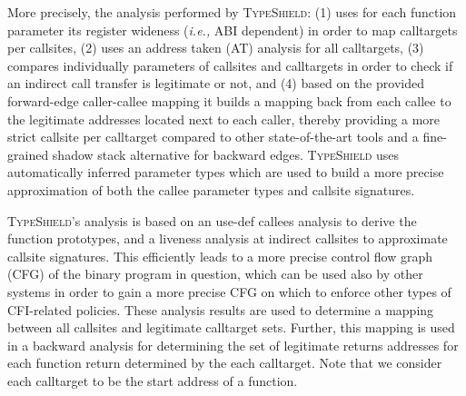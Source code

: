 More precisely, the analysis performed by \textsc{TypeShield}:
(1) uses for each function parameter its register wideness (\textit{i.e.,} ABI dependent) in order to map calltargets per callsites,  
(2) uses an address taken (AT) analysis for all calltargets, 
(3) compares individually parameters of callsites and calltargets in order to check if an indirect call transfer is legitimate or not, and
(4) based on the provided forward-edge caller-callee mapping it builds a mapping back from each callee to the legitimate addresses located next to each caller,
thereby providing a more strict callsite per calltarget compared to other state-of-the-art tools and a fine-grained shadow stack alternative for backward edges.
\textsc{TypeShield} uses automatically inferred parameter types which are used to build a more precise approximation of both the callee parameter types and callsite signatures. 

\textsc{TypeShield}'s analysis is based on an use-def callees analysis 
to derive the function prototypes, and a liveness analysis at indirect callsites to approximate callsite signatures. 
This efficiently leads to a more precise control flow graph (CFG) of the binary program in question, 
which can be used also by other systems in order to gain a more precise CFG on which to 
enforce other types of CFI-related policies. These analysis results are used to
determine a mapping between all callsites and legitimate calltarget sets. Further,
this mapping is used in a backward analysis for determining the set of legitimate 
returns addresses for each function return determined by the each calltarget. Note that 
we consider each calltarget to be the start address of a function.

